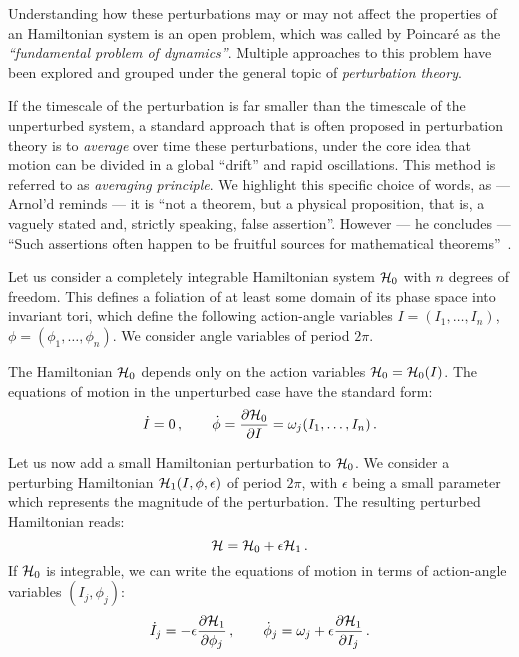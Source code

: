 Understanding how these perturbations may or may not affect the properties of an Hamiltonian system is an open problem, which was called by Poincaré as the \textit{``fundamental problem of dynamics''}. Multiple approaches to this problem have been explored and grouped under the general topic of \textit{perturbation theory}.

If the timescale of the perturbation is far smaller than the timescale of the unperturbed system, a standard approach that is often proposed in perturbation theory is to \textit{average} over time these perturbations, under the core idea that motion can be divided in a global ``drift'' and rapid oscillations. This method is referred to as \textit{averaging principle}. We highlight this specific choice of words, as --- Arnol'd reminds --- it is ``not a theorem, but a physical proposition, that is, a vaguely stated and, strictly speaking, false assertion''. However --- he concludes --- ``Such assertions often happen to be fruitful sources for mathematical theorems''~\cite{Arnold:937549}.

Let us consider a completely integrable Hamiltonian system $\mathcal{H}_0$ with $n$ degrees of freedom. This defines a foliation of at least some domain of its phase space into invariant tori, which define the following action-angle variables $I=(I_1, \ldots, I_n)$, $\phi=(\phi_1, \ldots, \phi_n)$. We consider angle variables of period $2\pi$.

The Hamiltonian $\mathcal{H}_0$ depends only on the action variables $\mathcal{H}_0=\mathcal{H}_0(I)$. The equations of motion in the unperturbed case have the standard form:
\begin{equation}
    \dot{I}=0\,, \qquad \dot{\phi} = \pdv{\mathcal{H}_0}{I} = \omega_j(I_1,\dots,I_n) \,.
\end{equation}

Let us now add a small Hamiltonian perturbation to $\mathcal{H}_0$. We consider a perturbing Hamiltonian $\mathcal{H}_1(I, \phi, \epsilon)$ of period $2\pi$, with $\epsilon$ being a small parameter which represents the magnitude of the perturbation. The resulting perturbed Hamiltonian reads:
\begin{equation}
    \mathcal{H} = \mathcal{H}_0 + \epsilon \mathcal{H}_1\,.
\end{equation}
%
If $\mathcal{H}_0$ is integrable, we can write the equations of motion in terms of action-angle variables $(I_j,\phi_j)$:
%
\begin{equation}
    \dot I_j = -\epsilon \pdv{\mathcal{H}_1}{\phi_j}\,,\qquad
	\dot \phi_j = \omega_j + \epsilon \pdv{\mathcal{H}_1}{I_j}\, .
\end{equation}
%

